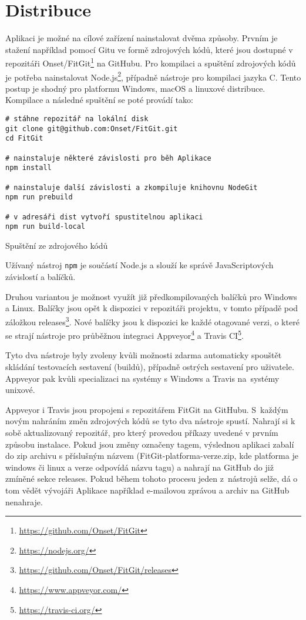 \chapter{Distribuce}

Aplikaci je možné na cílové zařízení nainstalovat dvěma způsoby. Prvním je stažení například pomocí Gitu ve formě zdrojových kódů, které jsou dostupné v repozitáři Onset/FitGit\footnote{\url{https://github.com/Onset/FitGit}} na GitHubu. Pro kompilaci a spuštění zdrojových kódů je potřeba nainstalovat Node.js\footnote{\url{https://nodejs.org/}}, případně nástroje pro kompilaci jazyka C. Tento postup je shodný pro platformu Windows, macOS a linuxové distribuce. Kompilace a následné spuštění se poté provádí tako:

\FloatBarrier
\begin{listing}[ht]
	\begin{verbatim}
# stáhne repozitář na lokální disk
git clone git@github.com:Onset/FitGit.git
cd FitGit

# nainstaluje některé závislosti pro běh Aplikace
npm install

# nainstaluje další závislosti a zkompiluje knihovnu NodeGit
npm run prebuild

# v adresáři dist vytvoří spustitelnou aplikaci
npm run build-local
	\end{verbatim}
	\caption{Spuštění ze zdrojového kódů}
\end{listing}
\FloatBarrier

Užívaný nástroj \texttt{npm} je součástí Node.js a slouží ke správě JavaScriptových závislostí a balíčků.

Druhou variantou je možnost využít již předkompilovaných balíčků pro Windows a Linux. Balíčky jsou opět k dispozici v repozitáři projektu, v tomto případě pod záložkou releases\footnote{\url{https://github.com/Onset/FitGit/releases}}. Nové balíčky jsou k dispozici ke každé otagované verzi, o které se strají nástroje pro průběžnou integraci Appveyor\footnote{\url{https://www.appveyor.com/}} a Travis CI\footnote{\url{https://travis-ci.org/}}.

Tyto dva nástroje byly zvoleny kvůli možnosti zdarma automaticky spouštět skládání testovacích sestavení (buildů), případně ostrých sestavení pro uživatele. Appveyor pak kvůli specializaci na systémy s Windows a Travis na~systémy unixové.

Appveyor i Travis jsou propojeni s repozitářem FitGit na GitHubu. S~každým novým nahráním změn zdrojových kódů se tyto dva nástroje spustí. Nahrají si k sobě aktualizovaný repozitář, pro který provedou příkazy uvedené v prvním způsobu instalace. Pokud jsou změny označeny tagem, výslednou aplikaci zabalí do zip archivu s příslušným názvem (FitGit-platforma-verze.zip, kde platforma je windows či linux a verze odpovídá názvu tagu) a nahrají na GitHub do již zmíněné sekce releases. Pokud během tohoto procesu jeden z~nástrojů selže, dá o tom vědět vývojáři Aplikace například e-mailovou zprávou a archiv na GitHub nenahraje.

